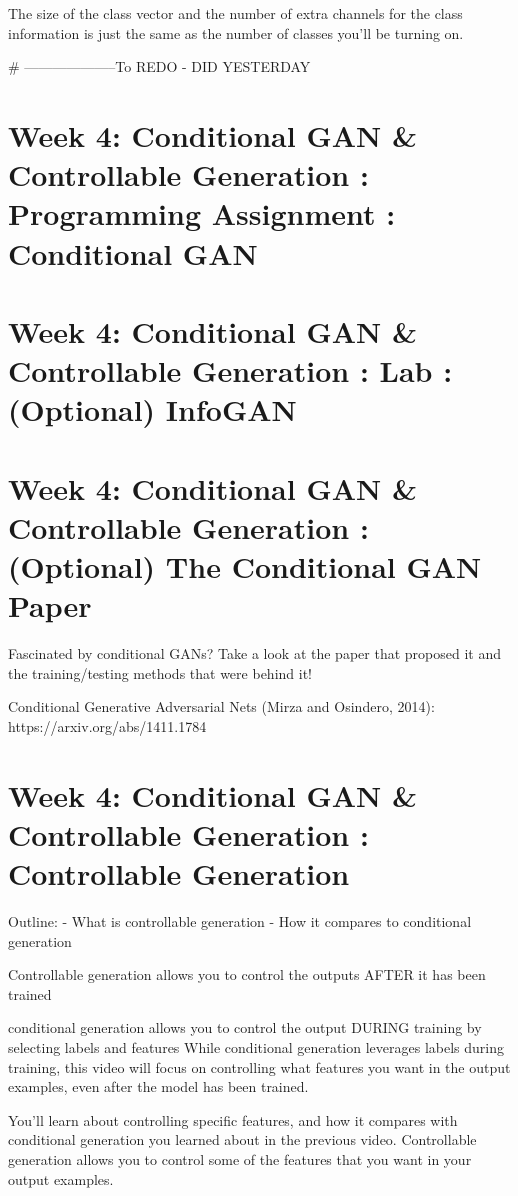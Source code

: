 \documentclass[11pt, onecolumn]{article}
\begin{document}
The size of the class vector and the number of extra channels for the class information is just the same as the number of classes you'll be turning on. 


# --------------------To REDO - DID YESTERDAY


\section{Week 4: Conditional GAN \& Controllable Generation : Programming Assignment : Conditional GAN}


\section{Week 4: Conditional GAN \& Controllable Generation : Lab : (Optional) InfoGAN}


\section{Week 4: Conditional GAN \& Controllable Generation :(Optional) The Conditional GAN Paper}

Fascinated by conditional GANs? Take a look at the paper that proposed it and the training/testing methods that were behind it!

Conditional Generative Adversarial Nets (Mirza and Osindero, 2014): https://arxiv.org/abs/1411.1784


\section{Week 4: Conditional GAN \& Controllable Generation : Controllable Generation}

Outline:
- What is controllable generation
- How it compares to conditional generation


Controllable generation allows you to control the outputs AFTER it has been trained

conditional generation allows you to control the output DURING training by selecting labels and features
While conditional generation leverages labels during training, this video will focus on controlling what
features you want in the output examples, even after the model has been trained.


You'll learn about controlling specific features, and how it compares with
conditional generation you learned
about in the previous video.
Controllable generation allows you to control some of the features that you want in your output examples.
\end{document}
